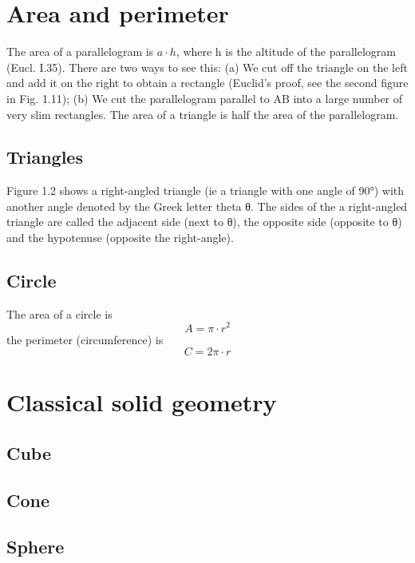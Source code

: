


\section{Area and perimeter}
The area of a parallelogram is $a \cdot h$, where h is the altitude of the parallelogram (Eucl. I.35). There are two ways to see this: (a) We cut off the triangle on the left and add it on the right to obtain a rectangle (Euclid’s proof, see the second figure in Fig. 1.11); (b) We cut the parallelogram parallel to AB into a large number of very slim rectangles. The area of a triangle is half the area of the parallelogram.

\subsection{Triangles}
Figure 1.2 shows a right-angled triangle (ie a triangle with one angle of 90°) with another angle denoted by the Greek letter theta θ. The sides of the a right-angled triangle are called the adjacent side (next to θ), the opposite side (opposite to θ) and the hypotenuse (opposite the right-angle).

\subsection{Circle}

\noindent The area of a circle is
\begin{equation}
A = \pi \cdot r^2
\end{equation}
the perimeter (circumference) is
\begin{equation}
C = 2\pi \cdot r
\end{equation}

\section{Classical solid geometry}
\subsection{Cube}
\subsection{Cone}
\subsection{Sphere}

